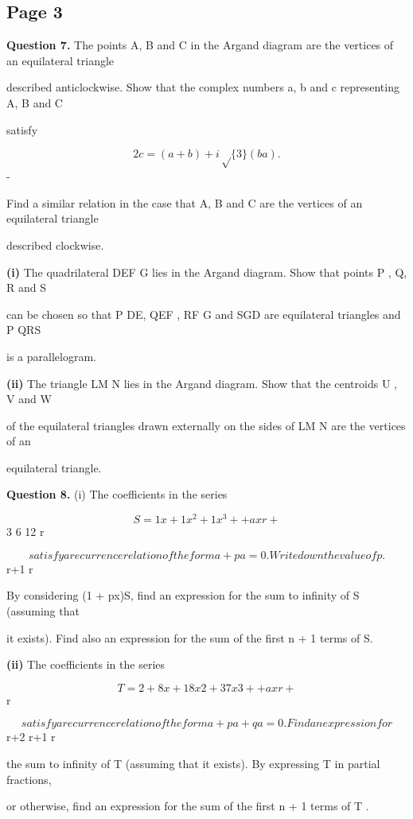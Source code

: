 \documentclass[12pt]{article}
\begin{document}
\subsection*{Page 3}
\begin{flushleft}
\bigskip\textbf{Question 7.} The points A, B and C in the Argand diagram are the vertices of an equilateral triangle\par
described anticlockwise. Show that the complex numbers a, b and c representing A, B and C\par
satisfy\par
\[2c = (a + b) + i\sqrt\{3\}(b a).\]
-\par
Find a similar relation in the case that A, B and C are the vertices of an equilateral triangle\par
described clockwise.\par
\textbf{(i)} The quadrilateral DEF G lies in the Argand diagram. Show that points P , Q, R and S\par
can be chosen so that P DE, QEF , RF G and SGD are equilateral triangles and P QRS\par
is a parallelogram.\par
\textbf{(ii)} The triangle LM N lies in the Argand diagram. Show that the centroids U , V and W\par
of the equilateral triangles drawn externally on the sides of LM N are the vertices of an\par
equilateral triangle.\par
[Note: The centroid of a triangle with vertices represented by the complex numbers\par
x, y and z is the point represented by 1 (x + y + z) .]\par
\bigskip\textbf{Question 8.} (i) The coefficients in the series\par
\[S = 1 x + 1 x^2 + 1 x^3 + + a xr +\]
3 6 12 \cdots r \cdots\par
\[satisfy a recurrence relation of the form a + pa = 0. Write down the value of p.\]
r+1 r\par
By considering (1 + px)S, find an expression for the sum to infinity of S (assuming that\par
it exists). Find also an expression for the sum of the first n + 1 terms of S.\par
\textbf{(ii)} The coefficients in the series\par
\[T = 2 + 8x + 18x2 + 37x3 + + a xr +\]
r\par
\cdots \cdots\par
\[satisfy a recurrence relation of the form a + pa + qa = 0. Find an expression for\]
r+2 r+1 r\par
the sum to infinity of T (assuming that it exists). By expressing T in partial fractions,\par
or otherwise, find an expression for the sum of the first n + 1 terms of T .\par
\end{flushleft}
\end{document}
